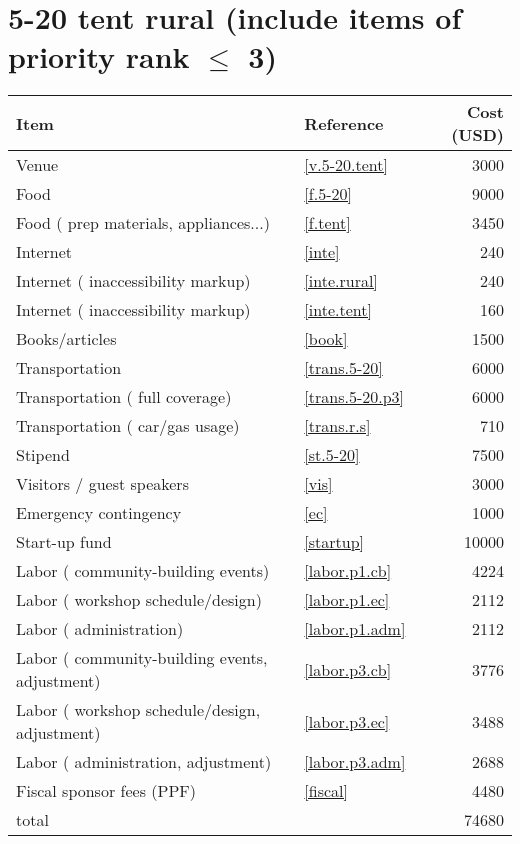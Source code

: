 \section*{5-20 tent rural (include items of priority rank $\leq$ 3)}
\begin{center}
\begin{tabular}{llr}
Item & Reference & Cost (USD) \\ \hline
Venue & \ref{v.5-20.tent} & 3000 \\
Food & \ref{f.5-20} & 9000 \\
Food ( prep materials, appliances...) & \ref{f.tent} & 3450 \\
Internet & \ref{inte} & 240 \\
Internet ( inaccessibility markup) & \ref{inte.rural} & 240 \\
Internet ( inaccessibility markup) & \ref{inte.tent} & 160 \\
Books/articles & \ref{book} & 1500 \\
Transportation & \ref{trans.5-20} & 6000 \\
Transportation ( full coverage) & \ref{trans.5-20.p3} & 6000 \\
Transportation ( car/gas usage) & \ref{trans.r.s} & 710 \\
Stipend & \ref{st.5-20} & 7500 \\
Visitors / guest speakers & \ref{vis} & 3000 \\
Emergency contingency & \ref{ec} & 1000 \\
Start-up fund & \ref{startup} & 10000 \\
Labor ( community-building events) & \ref{labor.p1.cb} & 4224 \\
Labor ( workshop schedule/design) & \ref{labor.p1.ec} & 2112 \\
Labor ( administration) & \ref{labor.p1.adm} & 2112 \\
Labor ( community-building events, adjustment) & \ref{labor.p3.cb} & 3776 \\
Labor ( workshop schedule/design, adjustment) & \ref{labor.p3.ec} & 3488 \\
Labor ( administration, adjustment) & \ref{labor.p3.adm} & 2688 \\
Fiscal sponsor fees (PPF) & \ref{fiscal} & 4480 \\ \hline
total &  & 74680
\end{tabular}
\end{center}
\newpage
